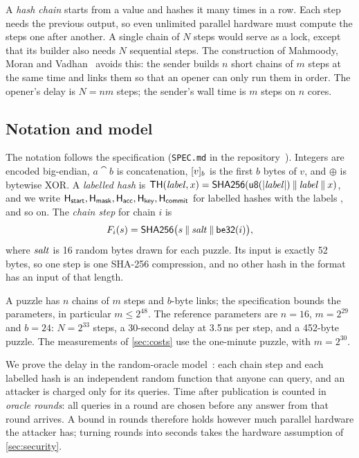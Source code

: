 A \emph{hash chain} starts from a value and hashes it many times in a row. Each step needs the previous output, so even unlimited parallel hardware must compute the steps one after another. A single chain of $N$ steps would serve as a lock, except that its builder also needs $N$ sequential steps. The construction of Mahmoody, Moran and Vadhan~\cite{MMV11} avoids this: the sender builds $n$ short chains of $m$ steps at the same time and links them so that an opener can only run them in order. The opener's delay is $N = nm$ steps; the sender's wall time is $m$ steps on $n$ cores.

\subsection{Notation and model}\label{sec:prelims}\label{sec:notation}

The notation follows the specification (\texttt{SPEC.md} in the repository~\cite{leanSealRepo}). Integers are encoded big-endian, $a \cat b$ is concatenation, $[v]_{b}$ is the first $b$ bytes of $v$, and $\oplus$ is bytewise XOR. A \emph{labelled hash} is $\mathsf{TH}(\mathit{label}, x) = \mathsf{SHA256}(\mathsf{u8}(|\mathit{label}|) \mathbin{\|} \mathit{label} \mathbin{\|} x)$, and we write $\mathsf{H}_{\mathsf{start}}, \mathsf{H}_{\mathsf{mask}}, \mathsf{H}_{\mathsf{acc}}, \mathsf{H}_{\mathsf{key}}, \mathsf{H}_{\mathsf{commit}}$ for labelled hashes with the labels ,  and so on. The \emph{chain step} for chain $i$ is
\[
  F_i(s) = \mathsf{SHA256}\bigl(s \mathbin{\|} \mathit{salt} \mathbin{\|} \mathsf{be32}(i)\bigr),
\]
where $\mathit{salt}$ is 16 random bytes drawn for each puzzle. Its input is exactly 52 bytes, so one step is one SHA-256 compression, and no other hash in the format has an input of that length.

A puzzle has $n$ chains of $m$ steps and $b$-byte links; the specification bounds the parameters, in particular $m \le 2^{48}$. The reference parameters are $n = 16$, $m = 2^{29}$ and $b = 24$: $N = 2^{33}$ steps, a 30-second delay at 3.5\,ns per step, and a 452-byte puzzle. The measurements of \cref{sec:costs} use the one-minute puzzle, with $m = 2^{30}$.

\label{sec:rom}We prove the delay in the random-oracle model~\cite{MMV11}: each chain step and each labelled hash is an independent random function that anyone can query, and an attacker is charged only for its queries. Time after publication is counted in \emph{oracle rounds}: all queries in a round are chosen before any answer from that round arrives. A bound in rounds therefore holds however much parallel hardware the attacker has; turning rounds into seconds takes the hardware assumption of \cref{sec:security}.

